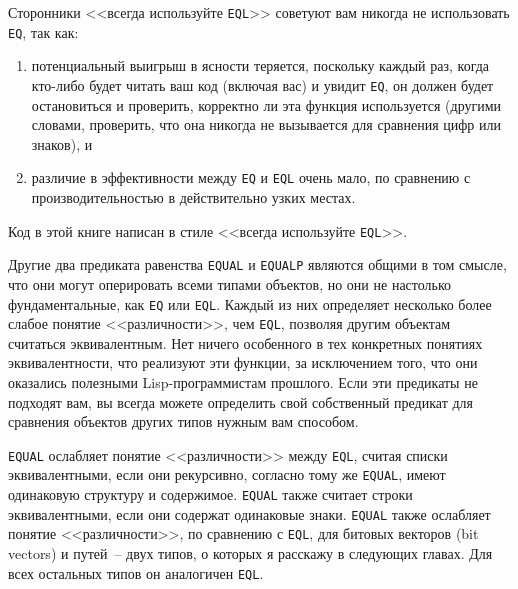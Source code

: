 Сторонники <<всегда используйте \lstinline{EQL}>> советуют вам никогда не использовать
\lstinline{EQ}, так как:

\begin{enumerate}
\item потенциальный выигрыш в ясности теряется, поскольку каждый раз, когда кто-либо
  будет читать ваш код (включая вас) и увидит \lstinline{EQ}, он должен будет остановиться и
  проверить, корректно ли эта функция используется (другими словами, проверить, что она
  никогда не вызывается для сравнения цифр или знаков), и
\item различие в эффективности между \lstinline{EQ} и \lstinline{EQL} очень мало, по
  сравнению с производительностью в действительно узких местах.
\end{enumerate}

Код в этой книге написан в стиле <<всегда используйте \lstinline{EQL}>>.

Другие два предиката равенства \lstinline{EQUAL} и \lstinline{EQUALP} являются общими в том
смысле, что они могут оперировать всеми типами объектов, но они не настолько
фундаментальные, как \lstinline{EQ} или \lstinline{EQL}. Каждый из них определяет несколько
более слабое понятие <<различности>>, чем \lstinline{EQL}, позволяя другим объектам считаться
эквивалентным. Нет ничего особенного в тех конкретных понятиях эквивалентности, что
реализуют эти функции, за исключением того, что они оказались полезными Lisp-программистам
прошлого. Если эти предикаты не подходят вам, вы всегда можете определить свой собственный
предикат для сравнения объектов других типов нужным вам способом.

\lstinline{EQUAL} ослабляет понятие <<различности>> между \lstinline{EQL}, считая списки
эквивалентными, если они рекурсивно, согласно тому же \lstinline{EQUAL}, имеют одинаковую
структуру и содержимое. \lstinline{EQUAL} также считает строки эквивалентными, если они
содержат одинаковые знаки. \lstinline{EQUAL} также ослабляет понятие <<различности>>, по
сравнению с \lstinline{EQL}, для битовых векторов (bit vectors) и путей~-- двух типов, о
которых я расскажу в следующих главах. Для всех остальных типов он аналогичен
\lstinline{EQL}.

